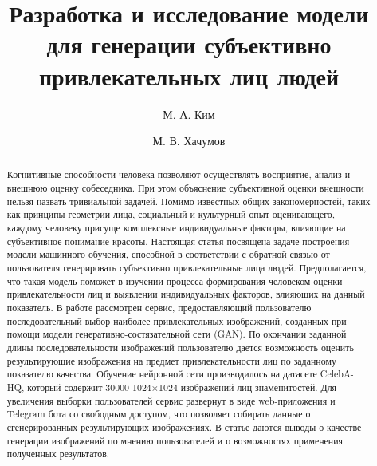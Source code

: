 \documentclass[60x84/16,8pt]{ittmm}
\begin{document}

\title{Разработка и исследование модели для генерации субъективно привлекательных лиц людей}

\author[1,2]{М. А. Ким}
\author[1]{М. В. Хачумов}

\address[1]{Кафедра математического моделирования и искусственного интеллекта,\\
  Российский университет дружбы народов,\\
  ул. Миклухо-Маклая, д.6, Москва, Россия, 117198}


\begin{abstract}
Когнитивные способности человека позволяют осуществлять восприятие, анализ и внешнюю оценку собеседника.
При этом объяснение субъективной оценки внешности нельзя назвать тривиальной задачей.
Помимо известных общих закономерностей, таких как принципы геометрии лица, социальный и культурный опыт оценивающего,
каждому человеку присуще комплексные индивидуальные факторы, влияющие на субъективное понимание красоты.
Настоящая статья посвящена задаче построения модели машинного обучения, способной в соответствии с обратной
связью от пользователя генерировать субъективно привлекательные лица людей. Предполагается, что такая модель
поможет в изучении процесса формирования человеком оценки привлекательности лиц и выявлении индивидуальных факторов,
влияющих на данный показатель. В работе рассмотрен сервис, предоставляющий пользователю последовательный выбор наиболее привлекательных изображений,
созданных при помощи модели генеративно-состязательной сети (GAN). По окончании заданной длины последовательности изображений
пользователю дается возможность оценить результирующие изображения на предмет привлекательности лиц по заданному показателю качества.
Обучение нейронной сети производилось на датасете CelebA-HQ, который содержит 30000 1024×1024 изображений лиц знаменитостей.
Для увеличения выборки пользователей сервис развернут в виде web-приложения и Telegram бота со свободным доступом, что позволяет
собирать данные о сгенерированных результирующих изображениях. В статье даются выводы о качестве генерации изображений по мнению
пользователей и о возможностях применения полученных результатов.
\end{abstract}

\end{document}
